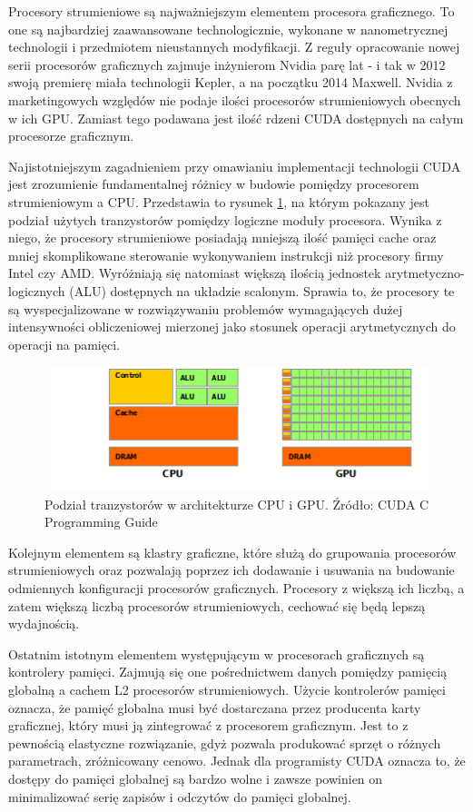 Procesory strumieniowe są najważniejszym elementem procesora graficznego. To one
są najbardziej zaawansowane technologicznie, wykonane w nanometrycznej
technologii i przedmiotem nieustannych modyfikacji. Z reguły opracowanie nowej
serii procesorów graficznych zajmuje inżynierom Nvidia parę lat - i tak w 2012
swoją premierę miała technologii Kepler, a na początku 2014 Maxwell. Nvidia z
marketingowych względów nie podaje ilości procesorów strumieniowych obecnych w ich GPU. Zamiast tego
podawana jest ilość rdzeni CUDA dostępnych na całym procesorze graficznym.

Najistotniejszym zagadnieniem przy omawianiu implementacji technologii CUDA jest
zrozumienie fundamentalnej różnicy w budowie pomiędzy procesorem strumieniowym a
CPU. Przedstawia to rysunek \ref{cpugpu}, na którym pokazany jest podział
użytych tranzystorów pomiędzy logiczne moduły procesora.  Wynika z
niego, że procesory strumieniowe posiadają mniejszą ilość pamięci cache oraz
mniej skomplikowane sterowanie wykonywaniem instrukcji niż procesory firmy Intel
czy AMD. Wyróżniają się natomiast większą ilością jednostek
arytmetyczno-logicznych (ALU) dostępnych na układzie scalonym. Sprawia to, że
procesory te są wyspecjalizowane w rozwiązywaniu problemów wymagających dużej
intensywności obliczeniowej mierzonej jako stosunek operacji arytmetycznych do
operacji na pamięci.

\begin{figure}[H]
\centering
\includegraphics{images/gpu-devotes-more-transistors-to-data-processing.png}
\caption{Podział tranzystorów w architekturze CPU i GPU. Źródło: CUDA C Programming Guide}
\label{cpugpu}
\end{figure}

Kolejnym elementem są klastry graficzne, które służą do grupowania procesorów
strumieniowych oraz pozwalają poprzez ich dodawanie i usuwania na budowanie
odmiennych konfiguracji procesorów graficznych\cite{gf680}. Procesory z większą
ich liczbą, a zatem większą liczbą procesorów strumieniowych, cechować się będą
lepszą wydajnością.

Ostatnim istotnym elementem występującym w procesorach graficznych są kontrolery
pamięci. Zajmują się one pośrednictwem danych pomiędzy pamięcią globalną a
cachem L2 procesorów strumieniowych. Użycie kontrolerów pamięci oznacza, że
pamięć globalna musi być dostarczana przez producenta karty graficznej,
	który musi ją zintegrować z procesorem graficznym. Jest to z
	pewnością elastyczne rozwiązanie, gdyż pozwala produkować sprzęt o różnych
	parametrach, zróżnicowany cenowo. Jednak dla programisty CUDA oznacza to, że
	dostępy do pamięci globalnej są bardzo wolne i
	zawsze powinien on minimalizować serię zapisów i odczytów do pamięci
	globalnej.

